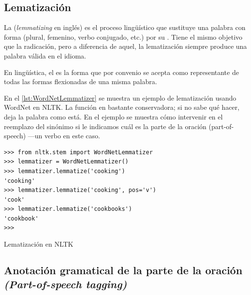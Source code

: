 \FloatBarrier
\subsection{Lematización}

La  (\emph{lemmatizing} en inglés) es el proceso lingüístico que sustituye una palabra con forma  (plural, femenino, verbo conjugado, etc.) por su . Tiene el mismo objetivo que la radicación, pero a diferencia de aquel, la lematización siempre produce una palabra válida en el idioma.

\begin{definition}[Lema]
En lingüística, el  es la forma que por convenio se acepta como representante de todas las formas flexionadas de una misma palabra.
\end{definition}

En el \autoref{lst:WordNetLemmatizer} se muestra un ejemplo de lematización usando WordNet en NLTK. La función en bastante conservadora; si no sabe qué hacer, deja la palabra como está. En el ejemplo se muestra cómo intervenir en el reemplazo del sinónimo si le indicamos cuál es la parte de la oración (part-of-speech) ---un verbo en este caso.

\begin{listing}[htbp]
\begin{verbatim}
>>> from nltk.stem import WordNetLemmatizer
>>> lemmatizer = WordNetLemmatizer()
>>> lemmatizer.lemmatize('cooking')
'cooking'
>>> lemmatizer.lemmatize('cooking', pos='v')
'cook'
>>> lemmatizer.lemmatize('cookbooks')
'cookbook'
>>> 
\end{verbatim}
\caption{Lematización en NLTK}
\label{lst:WordNetLemmatizer}
\end{listing}


\FloatBarrier
\subsection{Anotación gramatical de la parte de la oración \emph{(Part-of-speech tagging)}}

